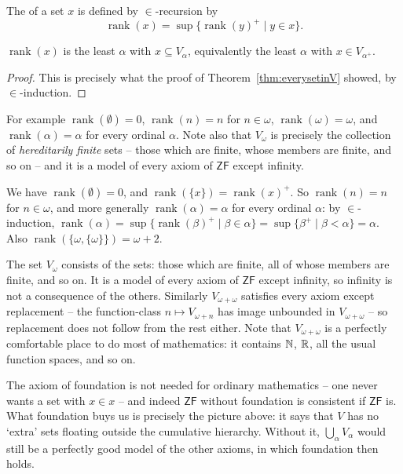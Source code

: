 \documentclass[a4paper]{scrartcl}
\newcommand{\rank}{\operatorname{rank}}
\newcommand{\ZF}{\mathsf{ZF}}
\begin{document}
\begin{definition}[Rank]
  The  of a set $x$ is defined by $\in$-recursion by
  $$
\rank(x) = \sup \{\rank(y)^+ \mid y \in x\}.
  $$
\end{definition}

\begin{proposition}
  $\rank(x)$ is the least $\alpha$ with $x \subseteq V_\alpha$, equivalently the least $\alpha$ with $x \in V_{\alpha^+}$.
\end{proposition}
\begin{proof}
  This is precisely what the proof of Theorem~\ref{thm:everysetinV} showed, by $\in$-induction.
\end{proof}

For example $\rank(\emptyset) = 0$, $\rank(n) = n$ for $n \in \omega$, $\rank(\omega) = \omega$, and $\rank(\alpha) = \alpha$ for every ordinal $\alpha$. Note also that $V_\omega$ is precisely the collection of \emph{hereditarily finite} sets -- those which are finite, whose members are finite, and so on -- and it is a model of every axiom of $\ZF$ except infinity.

\begin{example}
  We have $\rank(\emptyset) = 0$, and $\rank(\{x\}) = \rank(x)^+$. So $\rank(n) = n$ for $n \in \omega$, and more generally $\rank(\alpha) = \alpha$ for every ordinal $\alpha$: by $\in$-induction, $\rank(\alpha) = \sup\{\rank(\beta)^+ \mid \beta \in \alpha\} = \sup\{\beta^+ \mid \beta < \alpha\} = \alpha$. Also $\rank(\{\omega, \{\omega\}\}) = \omega + 2$.
\end{example}

\begin{example}
  The set $V_\omega$ consists of the  sets: those which are finite, all of whose members are finite, and so on. It is a model of every axiom of $\ZF$ except infinity, so infinity is not a consequence of the others. Similarly $V_{\omega+\omega}$ satisfies every axiom except replacement -- the function-class $n \mapsto V_{\omega + n}$ has image unbounded in $V_{\omega+\omega}$ -- so replacement does not follow from the rest either. Note that $V_{\omega + \omega}$ is a perfectly comfortable place to do most of mathematics: it contains $\mathbb{N}$, $\mathbb{R}$, all the usual function spaces, and so on.
\end{example}

\begin{remark}
  The axiom of foundation is not needed for ordinary mathematics -- one never wants a set with $x \in x$ -- and indeed $\ZF$ without foundation is consistent if $\ZF$ is. What foundation buys us is precisely the picture above: it says that $V$ has no `extra' sets floating outside the cumulative hierarchy. Without it, $\bigcup_\alpha V_\alpha$ would still be a perfectly good model of the other axioms, in which foundation then holds.
\end{remark}
\end{document}
